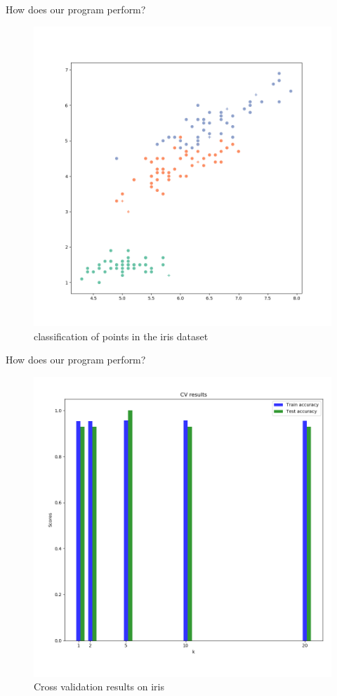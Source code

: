 \documentclass[11 pt]{beamer}
\begin{document}
\begin{frame}{How does our program perform?}
  \begin{figure}
    \includegraphics[width=.7\textwidth]{figures/iris3.png}
    \caption{classification of points in the iris dataset}
  \end{figure}
\end{frame}

\begin{frame}{How does our program perform?}
  \begin{figure}
    \includegraphics[width=.7\textwidth]{figures/iris3Cv2.png}
    \caption{Cross validation results on iris}
  \end{figure}
\end{frame}
\end{document}
